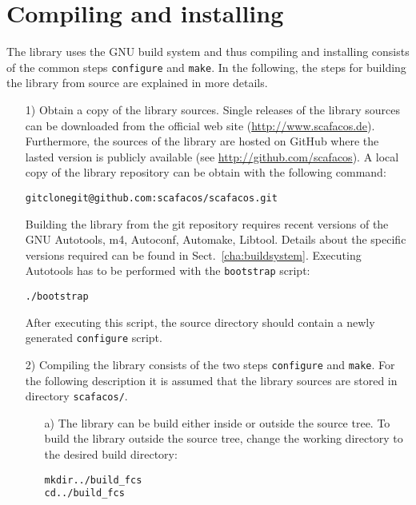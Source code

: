 \chapter{Compiling and installing \fcs}
\label{cha:compiling}


The \fcs library uses the GNU build system and thus compiling and installing consists of the common steps \texttt{configure} and \texttt{make}.
In the following, the steps for building the library from source are explained in more details.


\begin{enumerate}

  \item[1)]
Obtain a copy of the \fcs library sources.
Single releases of the library sources can be downloaded from the official web site (\url{http://www.scafacos.de}).
Furthermore, the sources of the library are hosted on GitHub where the lasted version is publicly available (see \url{http://github.com/scafacos}).
A local copy of the library repository can be obtain with the following command:
\begin{alltt}
  git clone git@github.com:scafacos/scafacos.git
\end{alltt}

Building the library from the git repository requires recent versions of the GNU Autotools, \ie m4, Autoconf, Automake, Libtool.
Details about the specific versions required can be found in Sect.~\ref{cha:buildsystem}.
Executing Autotools has to be performed with the \texttt{bootstrap} script:
\begin{alltt}
  ./bootstrap
\end{alltt}
After executing this script, the source directory should contain a newly generated \texttt{configure} script.

  \item[2)]
Compiling the library consists of the two steps \texttt{configure} and \texttt{make}.
For the following description it is assumed that the library sources are stored in directory \texttt{scafacos/}.

  \begin{enumerate}
  \item[a)]
The library can be build either inside or outside the source tree.
To build the library outside the source tree, change the working directory to the desired build directory:
\begin{alltt}
  mkdir ../build_fcs
  cd ../build_fcs
\end{alltt}


\end{enumerate}
\end{enumerate}
